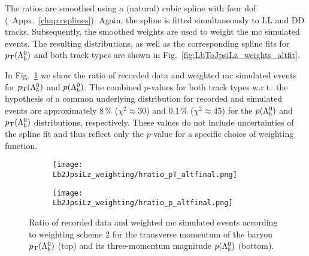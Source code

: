 The ratios are smoothed using a (natural) cubic spline with four \gls{dof} (\cf{}~Appx.~\ref{chap:csplines}).
Again, the spline is fitted simultaneously to \gls{LL} and \gls{DD} tracks.
Subsequently, the smoothed weights are used to weight the \gls{mc} simulated events.
The resulting distributions, as well as the corresponding spline fits for $\mbox{$p_{\mathrm{ T}}$}({{\Lambda}^0_{b}})$ and both track types are shown in Fig.~\ref{fig:LbToJpsiLz_weights_altfit}.

In Fig.~\ref{fig:LbToJpsiLz_hratio_altfinal} we show the ratio of recorded data and weighted \gls{mc} simulated events for $\mbox{$p_{\mathrm{ T}}$}({{\Lambda}^0_{b}})$ and $p({{\Lambda}^0_{b}})$.
The combined $p$-values for both track types w.r.t.\ the hypothesis of a common underlying distribution for recorded and simulated events are approximately $8\,\%$ ($\chi^2 \approx 30$) and $0.1\,\%$ ($\chi^2 \approx 45$) for the $p({{\Lambda}^0_{b}})$ and $\mbox{$p_{\mathrm{ T}}$}({{\Lambda}^0_{b}})$ distributions, respectively.
These values do not include uncertainties of the spline fit and thus reflect only the $p$-value for a specific choice of weighting function.

\begin{figure}[htbp]
    \centering
    \begin{subfigure}{\textwidth}
        \centering
        \texttt{[image: Lb2JpsiLz\_weighting/hratio\_pT\_altfinal.png]}
    \end{subfigure}
    \par\bigskip 
    \begin{subfigure}{\textwidth}
        \centering
        \texttt{[image: Lb2JpsiLz\_weighting/hratio\_p\_altfinal.png]}
    \end{subfigure}
    \caption{Ratio of recorded data and weighted \gls{mc} simulated events according to weighting scheme 2 for the transverse momentum of the \Lb baryon $\mbox{$p_{\mathrm{ T}}$}({{\Lambda}^0_{b}})$ (top) and its three-momentum magnitude $p({{\Lambda}^0_{b}})$ (bottom).}
    \label{fig:LbToJpsiLz_hratio_altfinal}
\end{figure}
